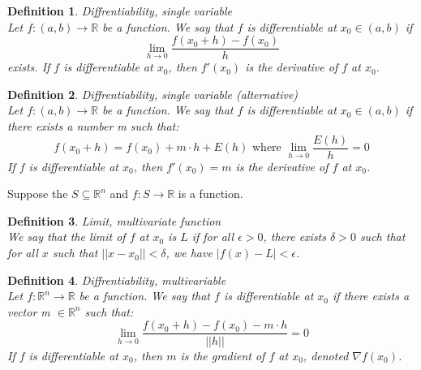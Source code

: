 \documentclass[11pt]{book} %
\newtheorem{definition}{Definition}[section]
\begin{document}
\begin{definition}{Diffrentiability, single variable} \\
Let $f: (a,b) \rightarrow \mathbb{R}$ be a function. We say that $f$ is differentiable at $x_0 \in (a,b)$ if
\begin{equation}
    \lim_{h \rightarrow 0} \frac{f(x_0 + h) - f(x_0)}{h}
\end{equation}
exists. If $f$ is differentiable at $x_0$, then $f'(x_0)$ is the derivative of $f$ at $x_0$.
\end{definition} 

\bigbreak

\begin{definition}{Diffrentiability, single variable (alternative)} \\
Let $f: (a,b) \rightarrow \mathbb{R}$ be a function. We say that $f$ is differentiable at $x_0 \in (a,b)$ if there exists a number m such that:
\begin{equation}
    f(x_0 + h) = f(x_0) + m \cdot h + E(h) \text{ where } \lim_{h \rightarrow 0} \frac{E(h)}{h} = 0
\end{equation}
If $f$ is differentiable at $x_0$, then $f'(x_0) = m$ is the derivative of $f$ at $x_0$.
\end{definition}

\bigbreak

Suppose the $S \subseteq \mathbb{R}^n$ and $f: S \rightarrow \mathbb{R}$ is a function. 

\bigbreak

\begin{definition}{Limit, multivariate function} \\
We say that the limit of $f$ at $x_0$ is $L$ if for all $\epsilon > 0$, there exists $\delta > 0$ such that 
for all $x$ such that $||x - x_0|| < \delta$, we have $|f(x) - L| < \epsilon$.
\end{definition}

\begin{definition}{Diffrentiability, multivariable} \\
    Let $f: \mathbb{R}^n \rightarrow \mathbb{R}$ be a function. We say that $f$ is differentiable at $x_0$ if there exists a vector m $\in \mathbb{R}^n$ such that:
    \begin{equation}
        \lim_{h \rightarrow 0} \frac{f(x_0 + h) - f(x_0) - m \cdot h}{||h||} = 0
    \end{equation}
    If $f$ is differentiable at $x_0$, then $m$ is the gradient of $f$ at $x_0$, denoted $\nabla f(x_0)$.
\end{definition}
    
\end{document}
